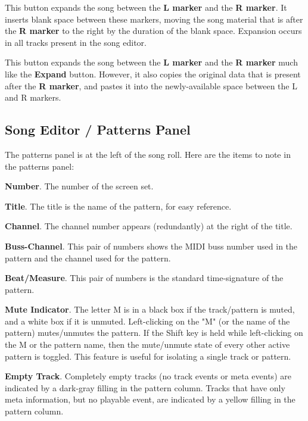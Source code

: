    This button expands the song between the
   \textbf{L marker} and the \textbf{R marker}.
   It inserts blank space between these markers, moving the song material
   that is after the \textbf{R marker}
   to the right by the duration of the blank space.
   Expansion occurs in all tracks present in the song editor.

   This button expands the song between the \textbf{L marker} and the
   \textbf{R marker} much like the \textbf{Expand} button.
   However, it also copies the original data that is present after the
   \textbf{R marker}, and pastes it into the newly-available space between
   the L and R markers.

\subsection{Song Editor / Patterns Panel}
\label{subsec:song_editor_patterns_panel}

   The patterns panel is at the left of the song roll.
   Here are the items to note in the patterns panel:

   \begin{enumber}
      \item \textbf{Number}.
         The number of the screen set.
      \item \textbf{Title}.
         The title is the name of the pattern, for easy reference.
      \item \textbf{Channel}.
         The channel number appears (redundantly)
         at the right of the title.
      \item \textbf{Buss-Channel}.
         This pair of numbers shows the MIDI buss number used in the pattern
         and the channel used for the pattern.
      \item \textbf{Beat/Measure}.
         This pair of numbers is the standard time-signature of the pattern.
      \item \textbf{Mute Indicator}.
         The letter M is in a black box if the track/pattern is muted, and a
         white box if it is unmuted.
         Left-clicking on the "M" (or the name of the pattern)
         mutes/unmutes the pattern.
         If the Shift key is held while left-clicking on the M or the pattern
         name, then
         the mute/unmute state of every other active pattern is toggled.
         This feature is useful for isolating a single track or pattern.
      \item \textbf{Empty Track}.
         Completely empty tracks (no track events or meta events)
         are indicated by a dark-gray filling in the pattern column.
         Tracks that have only meta information, but no playable event, are
         indicated by a yellow filling in the pattern column.
   \end{enumber}

